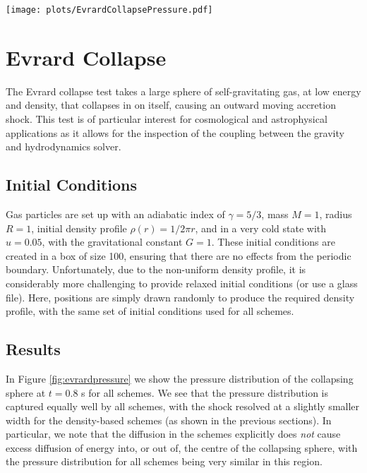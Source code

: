 
\begin{figure*}
    \centering
    \texttt{[image: plots/EvrardCollapsePressure.pdf]}
    \vspace{-0.7cm}
    \caption{Pressure as a function of radius from the centre of
    the sphere for the Evrard collapse, shown for our four schemes at time
    $t=0.8$ s. As usual, the blue background shows all particles, with the
    foreground black spots showing binned data with a $1\sigma$ scatter. In
    this case, as there is no analytic solution available for the Evrard, we
    show the solution with a high resolution 1D PPM code as the dashed purple
    line.}
    \label{fig:evrardpressure}
\end{figure*}


\section{Evrard Collapse}

The Evrard collapse \citep{Evrard1988} test takes a large sphere of
self-gravitating gas, at low energy and density, that collapses in on itself,
causing an outward moving accretion shock. This test is of particular interest for
cosmological and astrophysical applications as it allows for the inspection
of the coupling between the gravity and hydrodynamics solver.

\subsection{Initial Conditions}

Gas particles are set up with an adiabatic index of $\gamma=5/3$, mass $M=1$,
radius $R=1$, initial density profile $\rho(r) = 1 / 2\pi r$, and in a very
cold state with $u = 0.05$, with the gravitational constant $G=1$. These
initial conditions are created in a box of size 100, ensuring that there are
no effects from the periodic boundary. Unfortunately, due to the non-uniform
density profile, it is considerably more challenging to provide relaxed
initial conditions (or use a glass file). Here, positions are simply drawn
randomly to produce the required density profile, with the same set of
initial conditions used for all schemes.

\subsection{Results}

In Figure \ref{fig:evrardpressure} we show the pressure distribution of the
collapsing sphere at $t=0.8$ s for all schemes. We see that the pressure distribution
is captured equally well by all schemes, with the shock resolved at a slightly
smaller width for the density-based schemes (as shown in the previous sections).
In particular, we note that the diffusion in the \anarchy{} schemes explicitly does
\emph{not} cause excess diffusion of energy into, or out of, the centre of the
collapsing sphere, with the pressure distribution for all schemes being very
similar in this region.

